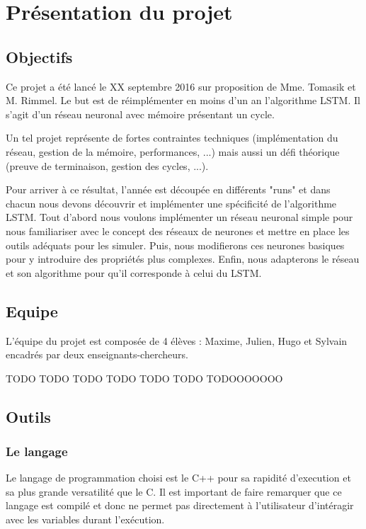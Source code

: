\chapter{Présentation du projet}

\section{Objectifs}

Ce projet a été lancé le XX septembre 2016 sur proposition de Mme. Tomasik et
M. Rimmel. Le but est de réimplémenter en moins d'un an l'algorithme
LSTM\footnotemark. Il s'agit d'un réseau neuronal avec mémoire présentant
un cycle.

\bigskip

Un tel projet représente de fortes contraintes techniques (implémentation du
réseau, gestion de la mémoire, performances, ...) mais aussi un défi théorique
(preuve de terminaison, gestion des cycles, ...).

\bigskip

Pour arriver à ce résultat, l'année est découpée en différents "runs" et dans
chacun nous devons découvrir et implémenter une spécificité de l'algorithme
LSTM. Tout d'abord nous voulons implémenter un réseau neuronal simple pour
nous familiariser avec le concept des réseaux de neurones et mettre en place
les outils adéquats pour les simuler. Puis, nous modifierons ces neurones
basiques pour y introduire des propriétés plus complexes. Enfin, nous
adapterons le réseau et son algorithme pour qu'il corresponde à celui du LSTM.

\section{Equipe}

L'équipe du projet est composée de 4 élèves : Maxime, Julien, Hugo et Sylvain
encadrés par deux enseignants-chercheurs.

TODO TODO TODO TODO TODO TODO TODOOOOOOO

\section{Outils}

\subsection{Le langage}
Le langage de programmation choisi est le C++ pour sa rapidité d'execution et
sa plus grande versatilité que le C. Il est important de faire remarquer que
ce langage est compilé et donc ne permet pas directement à l'utilisateur
d'intéragir avec les variables durant l'exécution.

